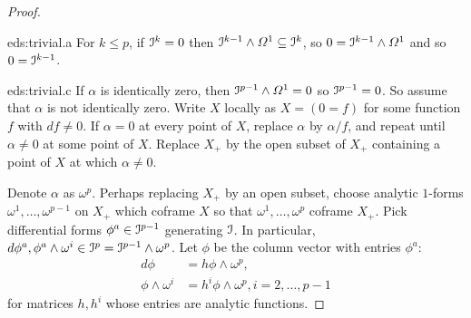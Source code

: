 \begin{proof}
\begin{answer}{eds:trivial.a}
For \(k\le p\), if \(\mathcal{I}^k=0\) then \(\mathcal{I}^{k-1}\wedge\Omega^1\subseteq \mathcal{I}^k\), so \(0=\mathcal{I}^{k-1}\wedge\Omega^1\) and so \(0=\mathcal{I}^{k-1}\).
\end{answer}
\begin{answer}{eds:trivial.c}
If \(\alpha\) is identically zero, then \(\mathcal{I}^{p-1}\wedge \Omega^1=0\) so \(\mathcal{I}^{p-1}=0\).
So assume that \(\alpha\) is not identically zero.
Write \(X\) locally as \(X=(0=f)\) for some function \(f\) with \(df\ne 0\).
If \(\alpha=0\) at every point of \(X\), replace \(\alpha\) by \(\alpha/f\), and repeat until \(\alpha\ne 0\) at some point of \(X\).
Replace \(X_+\) by the open subset of \(X_+\) containing a point of \(X\) at which \(\alpha\ne 0\).
\end{answer}
Denote \(\alpha\) as \(\omega^p\).
Perhaps replacing \(X_+\) by an open subset, choose analytic \(1\)-forms \(\omega^1,\dots,\omega^{p-1}\) on \(X_+\) which coframe \(X\) so that \(\omega^1,\dots,\omega^p\) coframe \(X_+\).
Pick differential forms \(\phi^a\in\mathcal{I}^{p-1}\) generating \(\mathcal{I}\).
In particular, \(d\phi^a,\phi^a\wedge\omega^i\in\mathcal{I}^p=\mathcal{I}^{p-1}\wedge\omega^p\).
Let \(\phi\) be the column vector with entries \(\phi^a\):
\begin{align*}
d\phi &= h \phi\wedge\omega^p,\\
\phi\wedge\omega^i&=h^i \phi\wedge\omega^p, i=2,\dots,p-1
\end{align*}
for matrices \(h,h^i\) whose entries are analytic functions.


\end{proof}
